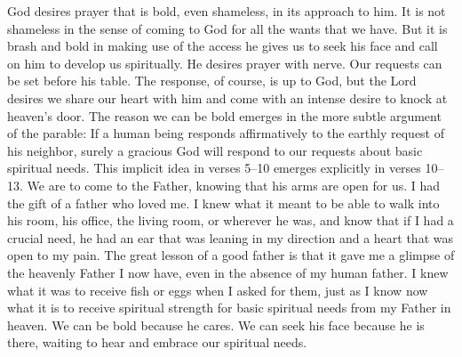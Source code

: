 			God desires prayer that is bold, even shameless, in its approach to him. It is not shameless in the sense of coming to God for all the wants that we have. But it is brash and bold in making use of the access he gives us to seek his face and call on him to develop us spiritually. He desires prayer with nerve. Our requests can be set before his table. The response, of course, is up to God, but the Lord desires we share our heart with him and come with an intense desire to knock at heaven's door. The reason we can be bold emerges in the more subtle argument of the parable: If a human being responds affirmatively to the earthly request of his neighbor, surely a gracious God will respond to our requests about basic spiritual needs. This implicit idea in verses 5--10 emerges explicitly in verses 10--13. We are to come to the Father, knowing that his arms are open for us. I had the gift of a father who loved me. I knew what it meant to be able to walk into his room, his office, the living room, or wherever he was, and know that if I had a crucial need, he had an ear that was leaning in my direction and a heart that was open to my pain. The great lesson of a good father is that it gave me a glimpse of the heavenly Father I now have, even in the absence of my human father. I knew what it was to receive fish or eggs when I asked for them, just as I know now what it is to receive spiritual strength for basic spiritual needs from my Father in heaven. We can be bold because he cares. We can seek his face because he is there, waiting to hear and embrace our spiritual needs.